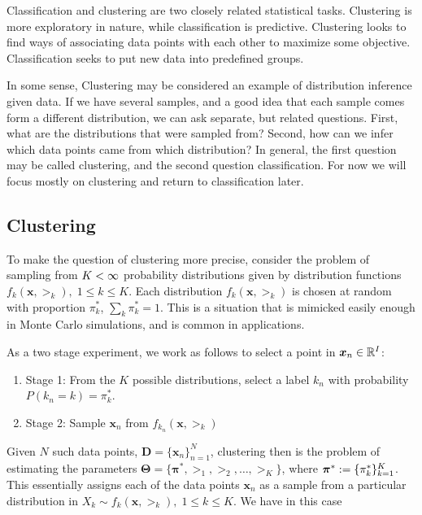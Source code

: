 \label{classvCluster}
Classification and clustering are two closely related statistical tasks.  Clustering is more exploratory in nature, while classification is predictive.  Clustering looks to find ways of associating data points with each other to maximize some objective.  Classification seeks to put new data into predefined groups.

In some sense, Clustering may be considered an example of distribution inference given data.  If we have several samples, and a good idea that each sample comes form a different distribution, we can ask separate, but related questions.  First, what are the distributions that were sampled from?  Second, how can we infer which data points came from which distribution? In general, the first question may be called clustering, and the second question classification. For now we will focus mostly on clustering and return to classification later.
\subsection{Clustering}
To make the question of clustering more precise, consider the problem of sampling from $K<\infty$ probability distributions given by distribution functions \(f_k(\bm x,\bm\gt_k),\; 1\leq k\leq K\). Each distribution $f_k(\bm x,\bm\gt_k)$ is chosen at random with proportion $\pi_k^\ast$, $\sum_k \pi_k^\ast=1$.  This is a situation that is mimicked easily enough in Monte Carlo simulations, and is common in applications.  

\begin{experiment}\label{exper:MCMixSample}
	As a two stage experiment, we work as follows to select a point in $\bm x_n\in\mathbb R^I$:
	\begin{enumerate}
		\item Stage 1: From the $K$ possible distributions, select a label $k_n$ with probability $P(k_n=k)=\pi_{k}^\ast$.
		\item Stage 2: Sample $\bm x_n$ from $f_{k_n}(\bm x,\bm\gt_k)$
	\end{enumerate}
	
\end{experiment}

Given $N$ such data points, $\bm D=\{\bm x_n\}_{n=1}^{N}$, clustering then is the problem of estimating the parameters $\bm\Theta=\{\bm\pi^\ast,\bm\gt_1,\bm\gt_2,\ldots,\bm\gt_K\}$, where $\bm\pi^\ast\mathrel{\mathop{:}}=\{\pi_k^\ast\}_{k=1}^{K}$. This essentially assigns each of the data points $\bm x_n$ as a sample from a particular distribution in \(X_k \sim f_k(\bm x,\bm \gt_k),\; 1\leq k\leq K\).  We have in this case 

